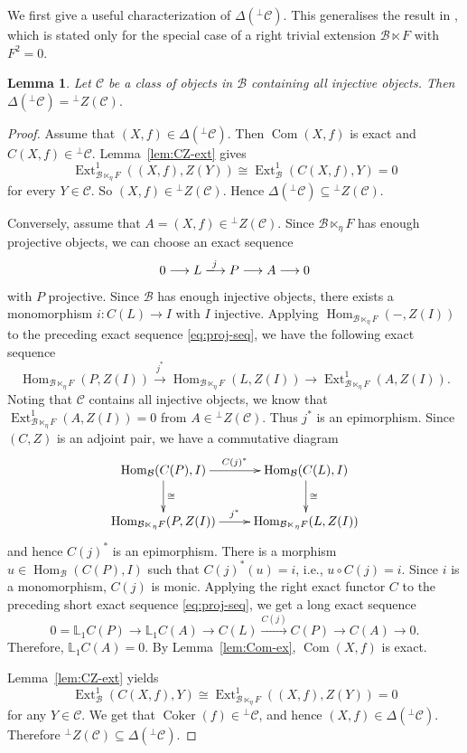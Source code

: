 \documentclass[11pt,reqno]{amsart}
\numberwithin{equation}{section}
\newtheorem{lemma}[theorem]{Lemma}
\newcommand{\cB}{\mathcal B}
\newcommand{\cC}{\mathcal C}
\newcommand{\Ext}{\operatorname{Ext}}
\newcommand{\Hom}{\operatorname{Hom}}
\newcommand{\Coker}{\operatorname{Coker}}
\newcommand{\Com}{\operatorname{Com}}
\begin{document}
We first give a useful characterization of $\Delta(^\perp\cC)$. This generalises the result in \cite[Lemma 3.8]{Hu}, which is stated only for the special case of
a right trivial extension
$\cB\ltimes F$ with $F^2=0$.


\begin{lemma}\label{lem:Delta-orthogonal}
Let $\cC$ be a class of objects in $\cB$ containing all injective objects. Then
$
\Delta({}^\perp\cC)={}^\perp Z(\cC).
$
\end{lemma}

\begin{proof}
Assume that $(X,f)\in\Delta({}^\perp\cC)$. Then $\Com(X,f)$ is exact and $C(X,f)\in{}^\perp\cC$. Lemma~\ref{lem:CZ-ext} gives
\[
\Ext^1_{\cB\ltimes_\eta F}((X,f),Z(Y))
 \cong \Ext^1_{\cB}(C(X,f),Y)=0
\]
for every $Y\in\cC$. So $(X,f)\in{}^\perp Z(\cC)$. Hence $\Delta({}^\perp\cC)\subseteq {}^\perp Z(\cC).$

Conversely, assume that $A=(X,f)\in{}^\perp Z(\cC)$. Since $\cB\ltimes_\eta F$ has enough projective objects, we can choose an exact sequence
\begin{equation}\label{eq:proj-seq}
0\longrightarrow L\xlongrightarrow{j} P\longrightarrow A\longrightarrow 0
\end{equation}
with $P$ projective.
Since $\cB$ has enough injective objects, there exists a monomorphism $i\colon C(L)\rightarrow I$ with $I$ injective. Applying $\Hom_{\cB\ltimes_\eta F}(-, Z(I))$ to the preceding
exact sequence \eqref{eq:proj-seq}, we have the following exact sequence
\[
\Hom_{\cB\ltimes_\eta F}(P, Z(I))\xrightarrow{j^*} \Hom_{\cB\ltimes_\eta F}(L, Z(I))\to \Ext^1_{\cB\ltimes_\eta F}(A, Z(I)).
\]
Noting that $\cC$ contains all injective objects, we know that $\Ext^1_{\cB\ltimes_\eta F}(A, Z(I))=0$ from $A\in{}^\perp Z(\cC)$. Thus $j^*$ is an epimorphism.
Since $(C,Z)$ is an adjoint pair, we have a commutative diagram
\[
\xymatrix{
\Hom_{\cB}(C(P), I)\ar[r]^{C(j)^*}\ar[d]^{\cong} & \Hom_{\cB}(C(L), I)\ar[d]^{\cong}\\
\Hom_{\cB\ltimes_\eta F}(P, Z(I))\ar[r]^{j^*} & \Hom_{\cB\ltimes_\eta F}(L, Z(I))
}
\]
and hence $C(j)^*$ is an epimorphism. There is a morphism $u\in \Hom_{\cB}(C(P), I)$ such that $C(j)^*(u)=i$, i.e., $u\circ C(j)=i$. Since $i$ is a monomorphism, $C(j)$ is monic.
Applying the right exact functor $C$ to the preceding short exact sequence \eqref{eq:proj-seq}, we get a long exact sequence
\[
0=\mathbb{L}_1C(P)\to\mathbb{L}_1C(A)\to C(L) \xrightarrow{C(j)} C(P)\to C(A)\to 0.
\]
Therefore, $\mathbb{L}_1C(A)=0$. By Lemma~\ref{lem:Com-ex}, $\Com(X,f)$ is exact.

Lemma~\ref{lem:CZ-ext} yields
\[
\Ext^1_{\cB}(C(X,f),Y)
 \cong \Ext^1_{\cB\ltimes_\eta F}((X,f),Z(Y))=0
\]
for any $Y\in\cC$. We get that $\Coker(f)\in{}^\perp\cC$, and hence $(X,f)\in\Delta({}^\perp\cC)$. Therefore ${}^\perp Z(\cC)\subseteq \Delta({}^\perp\cC).$
\end{proof}
\end{document}
